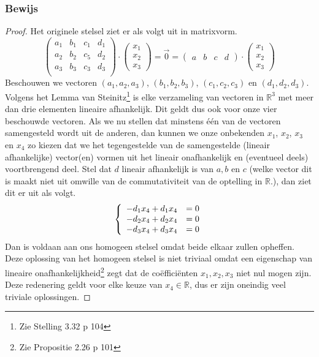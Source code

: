 \documentclass[lineaire_algebra_oplossingen.tex]{subfiles}
\begin{document}
\subsubsection*{Bewijs}
\begin{proof}
Het originele stelsel ziet er als volgt uit in matrixvorm.
\[
\begin{pmatrix}
a_1 & b_1 & c_1 & d_1\\
a_2 & b_2 & c_5 & d_2\\
a_3 & b_3 & c_3 & d_3\\
\end{pmatrix}
\cdot
\begin{pmatrix}
x_1\\ x_2\\x_3
\end{pmatrix}
= \vec{0}
= 
\begin{pmatrix}
a & b & c & d
\end{pmatrix}
\cdot
\begin{pmatrix}
x_1\\ x_2\\x_3
\end{pmatrix}
\]
Beschouwen we vectoren $(a_1,a_2,a_3)$, $(b_1,b_2,b_3)$, $(c_1,c_2,c_3)$ en $(d_1,d_2,d_3)$. Volgens het Lemma van Steinitz\footnote{Zie Stelling 3.32 p 104} is elke verzameling van vectoren in $\mathbb{R}^3$ met meer dan drie elementen lineaire afhankelijk. Dit geldt dus ook voor onze vier beschouwde vectoren. Als we nu stellen dat minstens \'e\'en van de vectoren samengesteld wordt uit de anderen, dan kunnen we onze onbekenden $x_1$, $x_2$, $x_3$ en $x_4$ zo kiezen dat we het tegengestelde van de samengestelde (lineair afhankelijke) vector(en) vormen uit het lineair onafhankelijk en (eventueel deels) voortbrengend deel. Stel dat $d$ lineair afhankelijk is van $a, b$ en $c$ (welke vector dit is maakt niet uit omwille van de commutativiteit van de optelling in $\mathbb{R}$.), dan ziet dit er uit als volgt.
\[
\left\lbrace
\begin{array}{c c}
-d_1x_4 + d_1x_4 &= 0 \\
-d_2x_4 + d_2x_4 &= 0 \\
-d_3x_4 + d_3x_4 &= 0 \\
\end{array}
\right.
\]
Dan is voldaan aan ons homogeen stelsel omdat beide elkaar zullen opheffen. Deze oplossing van het homogeen stelsel is niet triviaal omdat een eigenschap van lineaire onafhankelijkheid\footnote{Zie Propositie 2.26 p 101} zegt dat de co\"effici\"enten $x_1,x_2,x_3$ niet nul mogen zijn.
Deze redenering geldt voor elke keuze van $x_4\in \mathbb{R}$, dus er zijn oneindig veel triviale oplossingen.
\end{proof}


\end{document}
